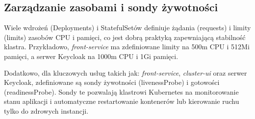 \subsection{Zarządzanie zasobami i sondy żywotności}
\label{sub:zasoby_sondy}
Wiele wdrożeń (Deployments) i StatefulSetów definiuje żądania (requests) i limity (limits) zasobów CPU i pamięci, co jest dobrą praktyką zapewniającą stabilność klastra. Przykładowo, \textit{front-service} ma zdefiniowane limity na 500m CPU i 512Mi pamięci, a serwer Keycloak na 1000m CPU i 1Gi pamięci.

Dodatkowo, dla kluczowych usług takich jak: \textit{front-service}, \textit{cluster-ui} oraz serwer Keycloak, zdefiniowane są sondy żywotności (livenessProbe) i gotowości (readinessProbe). Sondy te pozwalają klastrowi Kubernetes na monitorowanie stanu aplikacji i automatyczne restartowanie kontenerów lub kierowanie ruchu tylko do zdrowych instancji.
